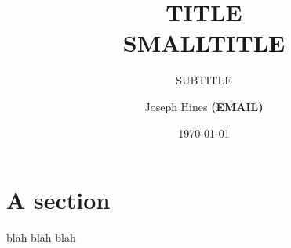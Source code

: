 \documentclass[12pt]{article}
\title{\textbf{ TITLE
    \\{\Large SMALLTITLE}}}
\subtitle{SUBTITLE}
\author{Joseph Hines \textbf{(EMAIL)}}
\date{\today}
\begin{document}
\begin{titlingpage}
\maketitle
\end{titlingpage}

\section*{A section}

blah blah blah
\end{document}
